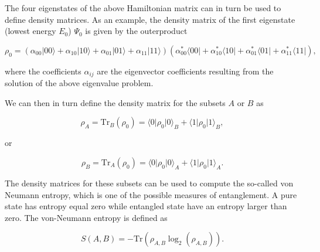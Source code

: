 \documentclass{beamer}
\begin{document}
\begin{frame}
The four eigenstates of the above Hamiltonian matrix can in turn be used to
define density matrices. As an example, the density matrix of the
first eigenstate (lowest energy $E_0$) $\Psi_0$ is given by the outerproduct

\[
\rho_0=\left(\alpha_{00}\vert 00 \rangle+\alpha_{10}\vert 10 \rangle+\alpha_{01}\vert 01 \rangle+\alpha_{11}\vert 11 \rangle\right)\left(\alpha_{00}^*\langle 00\vert+\alpha_{10}^*\langle 10\vert+\alpha_{01}^*\langle 01\vert+\alpha_{11}^*\langle 11\vert\right),
\]

where the coefficients $\alpha_{ij}$ are the eigenvector coefficients
resulting from the solution of the above eigenvalue problem. 

We can
then in turn define the density matrix for the subsets $A$ or $B$ as

\[
\rho_A=\mathrm{Tr}_B(\rho_{0})=\langle 0 \vert \rho_{0} \vert 0\rangle_{B}+\langle 1 \vert \rho_{0} \vert 1\rangle_{B},
\]

or

\[
\rho_B=\mathrm{Tr}_A(\rho_0)=\langle 0 \vert \rho_{0} \vert 0\rangle_{A}+\langle 1 \vert \rho_{0} \vert 1\rangle_{A}.
\]

The density matrices for these subsets can be used to compute the
so-called von Neumann entropy, which is one of the possible measures
of entanglement. A pure state has entropy equal zero while entangled
state have an entropy larger than zero. The von-Neumann entropy is
defined as

\[
S(A,B)=-\mathrm{Tr}\left(\rho_{A,B}\log_2 (\rho_{A,B})\right).
\]


\end{frame}
\end{document}
